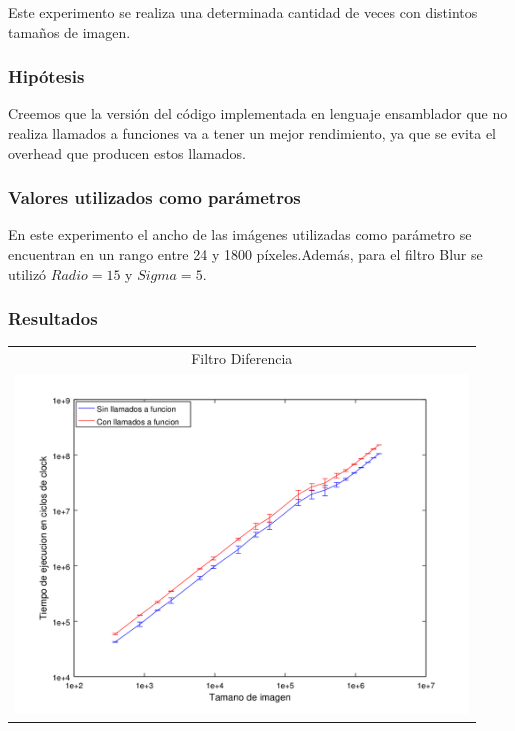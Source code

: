 		Este experimento se realiza una determinada cantidad de veces con distintos tamaños de imagen.

			\subsubsection*{Hipótesis} 
				Creemos que la versión del código implementada en lenguaje ensamblador que no realiza llamados a funciones va a tener un mejor rendimiento, ya que se evita el overhead que producen estos llamados.
		
			\subsubsection*{Valores utilizados como parámetros} 
				En este experimento el ancho de las imágenes utilizadas como parámetro se encuentran en un rango entre 24 y 1800 píxeles.Además, para el filtro Blur se utilizó $Radio = 15$ y $Sigma = 5$.


			\subsubsection*{Resultados}
				{\centering \begin{tabular}{c}
		      		{\small Filtro Diferencia} \\
		      		\includegraphics[width=12cm]{../exp/graficos/exp4-diff-c_vs_c2.png} \\
		    	\end{tabular}}

